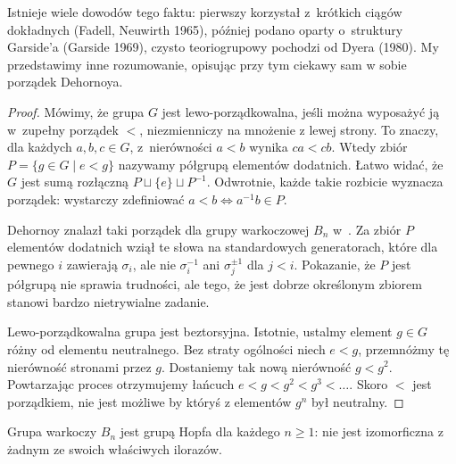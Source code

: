 Istnieje wiele dowodów tego faktu: pierwszy korzystał z~krótkich ciągów dokładnych (Fadell, Neuwirth 1965), później podano oparty o~struktury Garside'a (Garside 1969), czysto teoriogrupowy pochodzi od Dyera (1980).
My przedstawimy inne rozumowanie, opisując przy tym ciekawy sam w sobie porządek Dehornoya.

\begin{proof}
    Mówimy, że grupa $G$ jest lewo-porządkowalna, jeśli można wyposażyć ją w~zupełny porządek $<$, niezmienniczy na mnożenie z lewej strony.
    To znaczy, dla każdych $a, b, c \in G$, z~nierówności $a < b$ wynika $ca < cb$.
    Wtedy zbiór $P = \{g \in G \mid e < g\}$ nazywamy półgrupą elementów dodatnich.
    Łatwo widać, że $G$ jest sumą rozłączną $P \sqcup \{e\} \sqcup P^{-1}$.
    Odwrotnie, każde takie rozbicie wyznacza porządek: wystarczy zdefiniować $a < b \iff a^{-1}b \in P$.

    Dehornoy znalazł taki porządek dla grupy warkoczowej $B_n$ w~\cite{dehornoy94}.
    Za zbiór $P$ elementów dodatnich wziął te słowa na standardowych generatorach, które dla pewnego $i$ zawierają $\sigma_i$, ale nie $\sigma_i^{-1}$ ani $\sigma_j^{\pm 1}$ dla $j < i$.
    Pokazanie, że $P$ jest półgrupą nie sprawia trudności, ale tego, że jest dobrze określonym zbiorem stanowi bardzo nietrywialne zadanie.

    Lewo-porządkowalna grupa jest beztorsyjna.
    Istotnie, ustalmy element $g \in G$ różny od elementu neutralnego.
    Bez straty ogólności niech $e < g$, przemnóżmy tę nierówność stronami przez $g$.
    Dostaniemy tak nową nierówność $g < g^2$.
    Powtarzając proces otrzymujemy łańcuch $e < g < g^2 < g^3 < \ldots$.
    Skoro $<$ jest porządkiem, nie jest możliwe by któryś z elementów $g^n$ był neutralny.
\end{proof}

\begin{proposition}
    Grupa warkoczy $B_n$ jest grupą Hopfa dla każdego $n \ge 1$: nie jest izomorficzna z żadnym ze swoich właściwych ilorazów.
\end{proposition}

